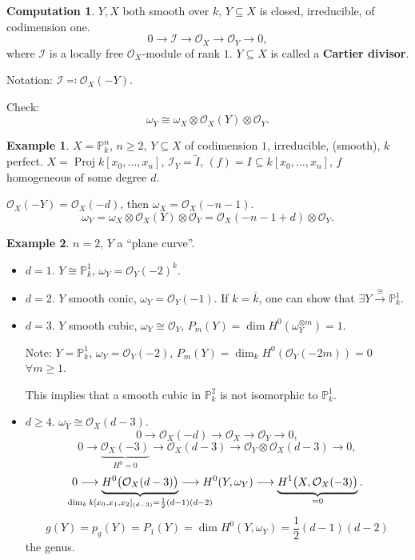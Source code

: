 \documentclass[12pt]{article}
\DeclareMathOperator{\Proj}{Proj}
\theoremstyle{definition}
\newtheorem*{example}{Example}
\newtheorem*{computation}{Computation}
\theoremstyle{remark}
\begin{document}
\begin{computation}
$Y,X$ both smooth over $k$, $Y\subseteq X$ is closed, irreducible, of codimension one.
\[0\longrightarrow\mathcal{I}\longrightarrow\mathcal{O}_X\longrightarrow\mathcal{O}_Y\longrightarrow0,\]
where $\mathcal{I}$ is a locally free $\mathcal{O}_X$-module of rank $1$. $Y\subseteq X$ is called a \textbf{Cartier divisor}.

Notation: $\mathcal{I}\eqqcolon\mathcal{O}_X(-Y)$.

Check:
\[\omega_Y\cong\omega_X\otimes\mathcal{O}_X(Y)\otimes\mathcal{O}_Y.\]

\begin{example}
$X=\mathbb{P}_k^n$, $n\geq2$, $Y\subseteq X$ of codimension $1$, irreducible, (smooth), $k$ perfect. $X=\Proj k[x_0,\ldots,x_n]$, $\mathcal{I}_Y=\widetilde{I}$, $(f)=I\subseteq k[x_0,\ldots,x_n]$, $f$ homogeneous of some degree $d$.

$\mathcal{O}_X(-Y)=\mathcal{O}_X(-d)$, then $\omega_X=\mathcal{O}_X(-n-1)$.
\[\omega_Y=\omega_X\otimes\mathcal{O}_X(Y)\otimes\mathcal{O}_Y=\mathcal{O}_X(-n-1+d)\otimes\mathcal{O}_Y.\]
\end{example}

\begin{example}
$n=2$, $Y$ a ``plane curve''.

\begin{itemize}
\item $d=1$. $Y\cong\mathbb{P}_k^1$, $\omega_Y=\mathcal{O}_Y(-2)^k$.

\item $d=2$. $Y$ smooth conic, $\omega_Y=\mathcal{O}_Y(-1)$. If $k=\overline{k}$, one can show that $\exists Y\xrightarrow{\cong}\mathbb{P}_k^1$.

\item $d=3$. $Y$ smooth cubic, $\omega_Y\cong\mathcal{O}_Y$, $P_m(Y)=\dim H^0(\omega_Y^{\otimes m})=1$.

Note: $Y=\mathbb{P}_k^1$, $\omega_Y=\mathcal{O}_Y(-2)$, $P_m(Y)=\dim_kH^0(\mathcal{O}_Y(-2m))=0$ $\forall m\geq1$.

This implies that a smooth cubic in $\mathbb{P}_k^2$ is not isomorphic to $\mathbb{P}_k^1$.

\item $d\geq4$. $\omega_Y\cong\mathcal{O}_X(d-3)$.
\[0\longrightarrow\mathcal{O}_X(-d)\longrightarrow\mathcal{O}_X\longrightarrow\mathcal{O}_Y\longrightarrow0,\]
\[0\longrightarrow\underbrace{\mathcal{O}_X(-3)}_{H^0=0}\longrightarrow\mathcal{O}_X(d-3)\longrightarrow\mathcal{O}_Y\otimes\mathcal{O}_X(d-3)\longrightarrow0,\]
\[0\longrightarrow\underbrace{H^0\big(\mathcal{O}_X(d-3)\big)}_{\mathclap{\dim_kk[x_0,x_1,x_2]_{(d-3)}=\frac{1}{2}(d-1)(d-2)}}\longrightarrow H^0(Y,\omega_Y)\longrightarrow\underbrace{H^1\big(X,\mathcal{O}_X(-3)\big)}_{=0}.\]
\[g(Y)=p_g(Y)=P_1(Y)=\dim H^0(Y,\omega_Y)=\frac{1}{2}(d-1)(d-2)\]
the genus.
\end{itemize}


\end{example}
\end{computation}
\end{document}
